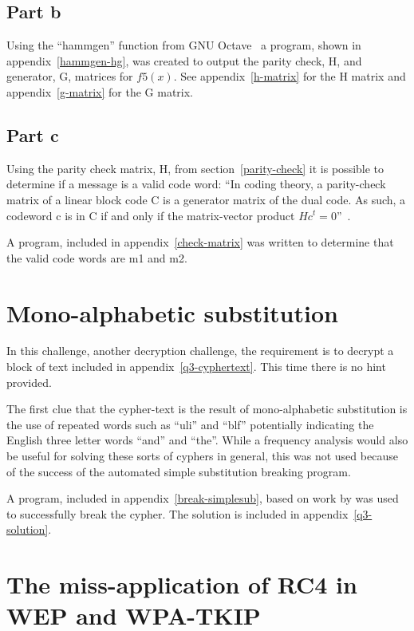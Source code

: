 \documentclass[pdftex, 12pt, a4paper]{article}
\begin{document}
\subsection{Part b}
Using the ``hammgen'' function from GNU Octave~\cite{hammgen-octave} a program,
shown in appendix~\ref{hammgen-hg}, was created to output the parity check,
H\label{parity-check}, and generator, G, matrices for $f5(x)$.
See appendix~\ref{h-matrix} for the H matrix and appendix~\ref{g-matrix} for the
G matrix.

\subsection{Part c}

Using the parity check matrix, H, from section~\ref{parity-check} it is possible
to determine if a message is a valid code word: ``In coding theory, a
parity-check matrix of a linear block code C is a generator matrix of the dual
code. As such, a codeword c is in C if and only if the matrix-vector product
$Hc^t = 0$''~\cite{check-matrix}.

A program, included in appendix~\ref{check-matrix} was written to determine that
the valid code words are m1 and m2.

\section{Mono-alphabetic substitution}\label{mono}
In this challenge, another decryption challenge, the requirement is to decrypt a
block of text included in appendix~\ref{q3-cyphertext}. This time there is no
hint provided.

The first clue that the cypher-text is the result of mono-alphabetic
substitution is the use of repeated words such as ``uli'' and ``blf''
potentially indicating the English three letter words ``and'' and ``the''. While
a frequency analysis would also be useful for solving these sorts of cyphers in
general, this was not used because of the success of the automated simple
substitution breaking program.

A program, included in appendix~\ref{break-simplesub}, based on work by
\textcite{stochastic-searching} was used to successfully break the cypher.
The solution is included in appendix~\ref{q3-solution}.

\section{The miss-application of RC4 in WEP and WPA-TKIP}\label{conclusions}
\end{document}
